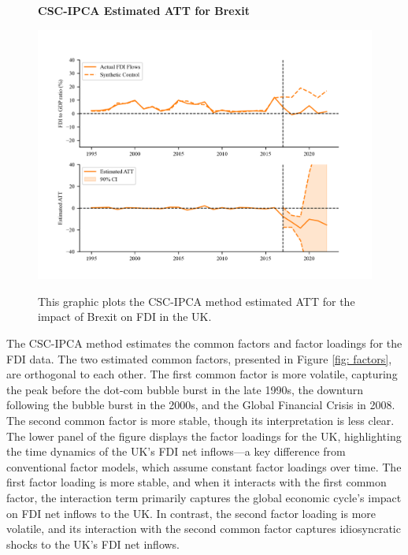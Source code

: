 \documentclass[12pt]{article}
\begin{document}
\begin{figure}[!ht]
    \centering
    \caption{\textbf{CSC-IPCA Estimated ATT for Brexit}}
    \includegraphics{figs/ukfdi_ipca.png}
    \label{fig: ipca_est}
    \caption*{\footnotesize{This graphic plots the CSC-IPCA method estimated ATT for the impact of Brexit on FDI in the UK.}}
    \end{figure}

The CSC-IPCA method estimates the common factors and factor loadings for the FDI data. The two estimated common factors, presented in Figure \ref{fig: factors}, are orthogonal to each other. The first common factor is more volatile, capturing the peak before the dot-com bubble burst in the late 1990s, the downturn following the bubble burst in the 2000s, and the Global Financial Crisis in 2008. The second common factor is more stable, though its interpretation is less clear. The lower panel of the figure displays the factor loadings for the UK, highlighting the time dynamics of the UK's FDI net inflows—a key difference from conventional factor models, which assume constant factor loadings over time. The first factor loading is more stable, and when it interacts with the first common factor, the interaction term primarily captures the global economic cycle's impact on FDI net inflows to the UK. In contrast, the second factor loading is more volatile, and its interaction with the second common factor captures idiosyncratic shocks to the UK's FDI net inflows.
\end{document}
